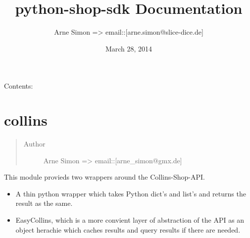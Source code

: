 \documentclass[letterpaper,10pt,english]{sphinxmanual}
\title{python-shop-sdk Documentation}
\date{March 28, 2014}
\author{Arne Simon =\textgreater{} email::{[}arne.simon@slice-dice.de{]}}
\begin{document}
\maketitle
\tableofcontents
{}\label{index::doc}


Contents:


\chapter{collins}
\label{collins:collins}\label{collins:welcome-to-python-shop-sdk-s-documentation}\label{collins::doc}\label{collins:module-collins}\begin{quote}\begin{description}
\item[{Author}] \leavevmode
Arne Simon =\textgreater{} email::{[}arne\_simon@gmx.de{]}

\end{description}\end{quote}

This module provieds two wrappers around the Collins-Shop-API.
\begin{itemize}
\item {} 
A thin python wrapper which takes Python dict's and list's and returns the
result as the same.

\item {} 
EasyCollins, which is a more convient layer of abstraction of the API as an
object herachie which caches results and query results if there are needed.

\end{itemize}
\end{document}
